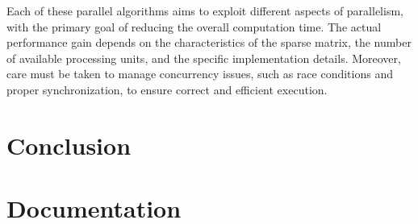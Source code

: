 \documentclass[12pt,oneside]{book} %
\begin{document}
Each of these parallel algorithms aims to exploit different aspects of
parallelism, with the primary goal of reducing the overall computation time.
The actual performance gain depends on the characteristics of the sparse
matrix, the number of available processing units, and the specific
implementation details. Moreover, care must be taken to manage concurrency
issues, such as race conditions and proper synchronization, to ensure correct
and efficient execution.

\newpage
\chapter{Conclusion}




\appendix
\chapter{Documentation}
\end{document}
